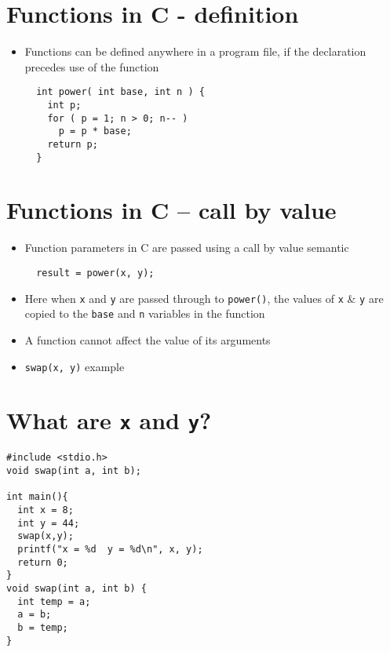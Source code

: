 \documentclass{article}
\begin{document}
\section{Functions in C - definition}
\begin{itemize}
\item Functions can be defined anywhere in a program file, if the declaration precedes use of the function

\begin{verbatim}
  int power( int base, int n ) {
    int p;
    for ( p = 1; n > 0; n-- )
      p = p * base;
    return p;
  }
\end{verbatim}
\end{itemize}





\section{Functions in C -- call by value}
\begin{itemize}
\item Function parameters in C are passed using a call by value semantic

\begin{verbatim}
  result = power(x, y);
\end{verbatim}

\item Here when \verb!x! and \verb!y! are passed through to \verb!power()!, the values of \verb!x! \& \verb!y! are copied to the \verb!base! and \verb!n! variables in the function

\item A function cannot affect the value of its arguments
\item \verb!swap(x, y)! example
\end{itemize}



\section{What are \texttt{x} and \texttt{y}?}
\begin{verbatim}
#include <stdio.h>
void swap(int a, int b);

int main(){
  int x = 8;
  int y = 44;
  swap(x,y);
  printf("x = %d  y = %d\n", x, y);
  return 0;
}
void swap(int a, int b) {
  int temp = a;
  a = b;
  b = temp;
}
\end{verbatim}
\end{document}
